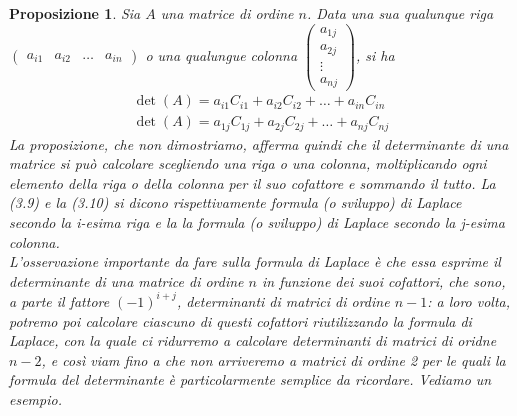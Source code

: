 \documentclass{book}
\newtheorem{proposizione}{Proposizione}
\begin{document}
\begin{proposizione}
  Sia $A$ una matrice di ordine $n$. Data una sua qualunque riga $\begin{pmatrix} a_{i1} & a_{i2} & \dots & a_{in} \end{pmatrix}$ o una qualungue colonna $\begin{pmatrix} a_{1j} \\ a_{2j} \\ \vdots \\ a_{nj} \end{pmatrix}$, si ha
  \begin{eqnarray}
    \det(A)=a_{i1}C_{i1}+a_{i2}C_{i2}+\dots+a_{in}C_{in}\\
    \det(A)=a_{1j}C_{1j}+a_{2j}C_{2j}+\dots+a_{nj}C_{nj}
  \end{eqnarray}
  La proposizione, che non dimostriamo, afferma quindi che il determinante di una matrice si può calcolare scegliendo una riga o una colonna, moltiplicando ogni elemento della riga o della colonna per il suo cofattore e sommando il tutto. La (3.9) e la (3.10) si dicono rispettivamente \textit{formula (o sviluppo) di Laplace secondo la i-esima riga e la la formula (o sviluppo) di Laplace secondo la j-esima colonna.}\\
  L'osservazione importante da fare sulla formula di Laplace è che essa esprime il determinante di una matrice di ordine $n$ in funzione dei suoi cofattori, che sono, a parte il fattore $(-1)^{i+j}$, determinanti di matrici di ordine $n-1$: a loro volta, potremo poi calcolare ciascuno di questi cofattori riutilizzando la formula di Laplace, con la quale ci ridurremo a calcolare determinanti di matrici di oridne $n - 2$, e così viam fino a che non arriveremo a matrici di ordine 2 per le quali la formula del determinante è particolarmente semplice da ricordare. Vediamo un esempio.
\end{proposizione}
\end{document}

